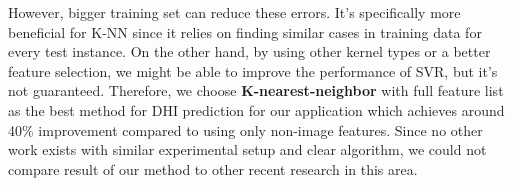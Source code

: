 However, bigger training set can reduce these errors. It's specifically more beneficial for K-NN since it relies on finding similar cases in training data for every test instance. On the other hand, by using other kernel types or a better feature selection, we might be able to improve the performance of SVR, but it's not guaranteed. Therefore, we choose \textbf{K-nearest-neighbor} with full feature list as the best method for DHI prediction for our application which achieves around 40\% improvement compared to using only non-image features. Since no other work exists with similar experimental setup and clear algorithm, we could not compare result of our method to other recent research in this area.

